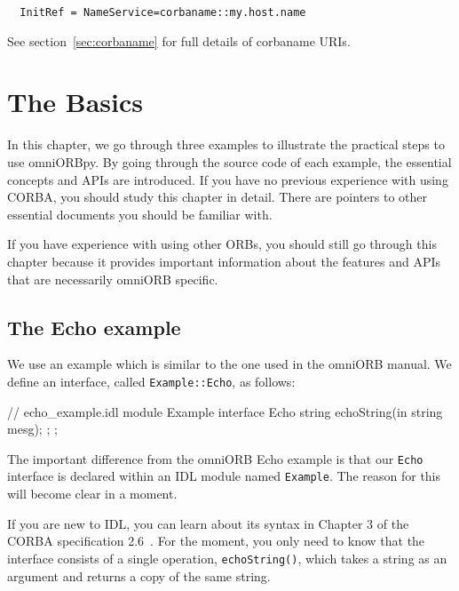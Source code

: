 \documentclass[11pt,oneside,a4paper]{book}
\newcommand{\intf}[1]{\texttt{#1}}
\newcommand{\module}[1]{\texttt{#1}}
\newcommand{\op}[1]{\texttt{#1()}}
\begin{document}
\begin{verbatim}
  InitRef = NameService=corbaname::my.host.name
\end{verbatim}

\noindent See section~\ref{sec:corbaname} for full details of
corbaname URIs.



\chapter{The Basics}
\label{chap:basics}

In this chapter, we go through three examples to illustrate the
practical steps to use omniORBpy. By going through the source code of
each example, the essential concepts and APIs are introduced. If you
have no previous experience with using CORBA, you should study this
chapter in detail. There are pointers to other essential documents you
should be familiar with.

If you have experience with using other ORBs, you should still go
through this chapter because it provides important information about
the features and APIs that are necessarily omniORB specific.


\section{The Echo example}

We use an example which is similar to the one used in the omniORB
manual. We define an interface, called \intf{Example::Echo}, as
follows:

\begin{idllisting}
// echo_example.idl
module Example {
  interface Echo {
    string echoString(in string mesg);
  };
};
\end{idllisting}

The important difference from the omniORB Echo example is that our
\intf{Echo} interface is declared within an IDL module named
\module{Example}. The reason for this will become clear in a moment.

If you are new to IDL, you can learn about its syntax in Chapter 3 of
the CORBA specification 2.6~\cite{corba26-spec}. For the moment, you
only need to know that the interface consists of a single operation,
\op{echoString}, which takes a string as an argument and returns a
copy of the same string.
\end{document}
